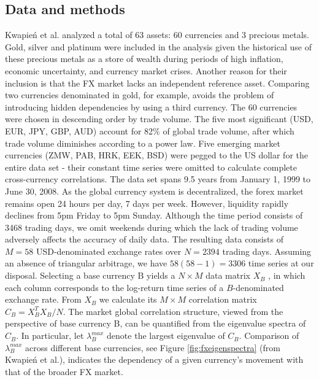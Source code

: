\documentclass[a4paper]{article}
\begin{document}
\begin{multicols}{2}
\subsection{Data and methods}
Kwapień et al. analyzed a total of 63 assets: 60 currencies and 3 precious metals. Gold, silver and platinum were included in the analysis given the historical use of these precious metals as a store of wealth during periods of high inflation, economic uncertainty, and currency market crises. Another reason for their inclusion is that the FX market lacks an independent reference asset. Comparing two currencies denominated in gold, for example, avoids the problem of introducing hidden dependencies by using a third currency. The 60 currencies were chosen in descending order by trade volume. The five most significant (USD, EUR, JPY, GBP, AUD) account for 82\% of global trade volume, after which trade volume diminishes according to a power law. Five emerging market currencies (ZMW, PAB, HRK, EEK, BSD) were pegged to the US dollar for the entire data set - their constant time series were omitted to calculate complete cross-currency correlations. 
The data set spans 9.5 years from January 1, 1999 to June 30, 2008. As the global currency system is decentralized, the forex market remains open 24 hours per day, 7 days per week. However, liquidity rapidly declines from 5pm Friday to 5pm Sunday. Although the time period consists of 3468 trading days, we omit weekends during which the lack of trading volume adversely affects the accuracy of daily data. The resulting data consists of $M=58$ USD-denominated exchange rates over $N=2394$ trading days. Assuming an absence of triangular arbitrage, we have $58(58-1) = 3306$ time series at our disposal.
Selecting a base currency B yields a $N \times M$ data matrix $X_B$ , in which each column corresponds to the log-return time series of a $B$-denominated exchange rate. From $X_B$ we calculate its $M \times M$ correlation matrix $C_B = X_B^TX_B/N$. The market global correlation structure, viewed from the perspective of base currency B, can be quantified from the eigenvalue spectra of $C_B$. In particular, let $\lambda_B^{max}$ denote the largest eigenvalue of $C_B$. Comparison of $\lambda_B^{max}$ across different base currencies, see Figure \ref{fig:fxeigenspectra} (from Kwapień et al.), indicates the dependency of a given currency's movement with that of the broader FX market.
\begin{figure}[H]
\centering

\end{figure}
\end{multicols}
\end{document}
